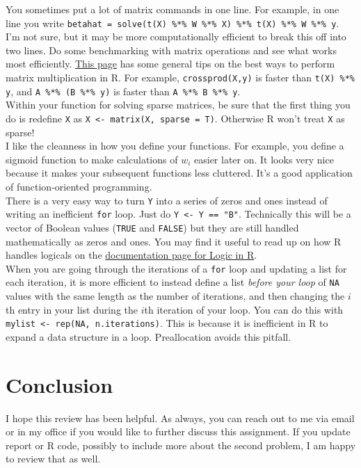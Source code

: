 \documentclass[11pt]{article}
\begin{document}
You sometimes put a lot of matrix commands in one line. For example, in one line you write \texttt{betahat = solve(t(X) \%*\% W \%*\% X) \%*\% t(X) \%*\% W \%*\% y}. I'm not sure, but it may be more computationally efficient to break this off into two lines. Do some benchmarking with matrix operations and see what works most efficiently. \href{http://pj.freefaculty.org/blog/?p=122}{This page} has some general tips on the best ways to perform matrix multiplication in R. For example, \texttt{crossprod(X,y)} is faster than \texttt{t(X) \%*\% y}, and \texttt{A \%*\% (B \%*\% y)} is faster than \texttt{A \%*\% B \%*\% y}. \\

Within your function for solving sparse matrices, be sure that the first thing you do is redefine \texttt{X} as \texttt{X <- matrix(X, sparse = T)}. Otherwise R won't treat \texttt{X} as sparse! \\

I like the cleanness in how you define your functions. For example, you define a sigmoid function to make calculations of $w_i$ easier later on. It looks very nice because it makes your subsequent functions less cluttered. It's a good application of function-oriented programming.\\

There is a very easy way to turn \texttt{Y} into a series of zeros and ones instead of writing an inefficient \texttt{for} loop. Just do \texttt{Y <- Y == "B"}. Technically this will be a vector of Boolean values (\texttt{TRUE} and \texttt{FALSE}) but they are still handled mathematically as zeros and ones. You may find it useful to read up on how R handles logicals on the \href{https://stat.ethz.ch/R-manual/R-devel/library/base/html/Logic.html}{documentation page for Logic in R}. \\

When you are going through the iterations of a \texttt{for} loop and updating a list for each iteration, it is more efficient to instead define a list \emph{before your loop} of \texttt{NA} values with the same length as the number of iterations, and then changing the $i$th entry in your list during the $i$th iteration of your loop. You can do this with \texttt{mylist <- rep(NA, n.iterations)}. This is because it is inefficient in R to expand a data structure in a loop. Preallocation avoids this pitfall.



\section{Conclusion}\label{conclusions}
I hope this review has been helpful. As always, you can reach out to me via email or in my office if you would like to further discuss this assignment. If you update report or R code, possibly to include more about the second problem, I am happy to review that as well.
\end{document}
